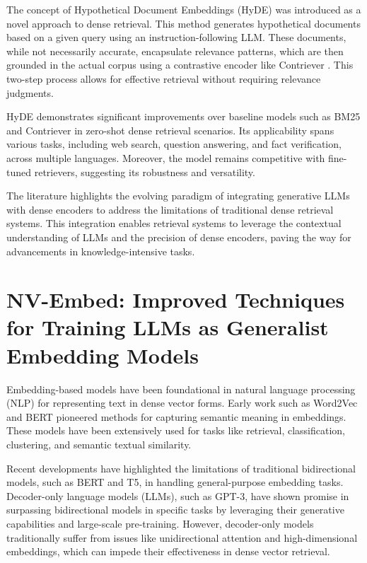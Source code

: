 The concept of Hypothetical Document Embeddings (HyDE) was introduced as a novel approach to dense retrieval. This method generates hypothetical documents based on a given query using an instruction-following LLM. These documents, while not necessarily accurate, encapsulate relevance patterns, which are then grounded in the actual corpus using a contrastive encoder like Contriever \cite{izacard2022unsuperviseddenseinformationretrieval}. This two-step process allows for effective retrieval without requiring relevance judgments.

HyDE demonstrates significant improvements over baseline models such as BM25 and Contriever in zero-shot dense retrieval scenarios. Its applicability spans various tasks, including web search, question answering, and fact verification, across multiple languages. Moreover, the model remains competitive with fine-tuned retrievers, suggesting its robustness and versatility.

The literature highlights the evolving paradigm of integrating generative LLMs with dense encoders to address the limitations of traditional dense retrieval systems. This integration enables retrieval systems to leverage the contextual understanding of LLMs and the precision of dense encoders, paving the way for advancements in knowledge-intensive tasks.

\section*{NV-Embed: Improved Techniques for Training LLMs as Generalist Embedding Models\cite{nvembed}}

Embedding-based models have been foundational in natural language processing (NLP) for representing text in dense vector forms. Early work such as Word2Vec\cite{word2vec} and BERT\cite{devlin2019bertpretrainingdeepbidirectional} pioneered methods for capturing semantic meaning in embeddings. These models have been extensively used for tasks like retrieval, classification, clustering, and semantic textual similarity.

Recent developments have highlighted the limitations of traditional bidirectional models, such as BERT and T5, in handling general-purpose embedding tasks. Decoder-only language models (LLMs), such as GPT-3\cite{gpt3}, have shown promise in surpassing bidirectional models in specific tasks by leveraging their generative capabilities and large-scale pre-training. However, decoder-only models traditionally suffer from issues like unidirectional attention and high-dimensional embeddings, which can impede their effectiveness in dense vector retrieval.

